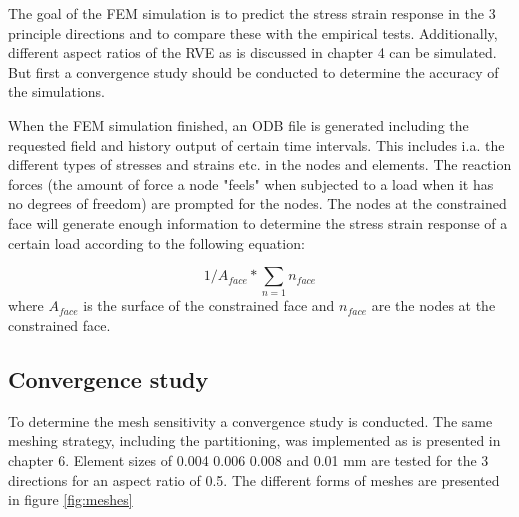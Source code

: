 The goal of the FEM simulation is to predict the stress strain response in the 3 principle directions and to compare these with the empirical tests. Additionally, different aspect ratios of the RVE as is discussed in chapter 4 can be simulated. But first a convergence study should be conducted to determine the accuracy of the simulations.

When the FEM simulation finished, an ODB file is generated including the requested field and history output of certain time intervals. This includes i.a. the different types of stresses and strains etc. in the nodes and elements. The reaction forces (the amount of force a node "feels" when subjected to a load when it has no degrees of freedom) are prompted for the nodes. The nodes at the constrained face will generate enough information to determine the stress strain response of a certain load according to the following equation: 

\begin{equation} \label{eqn:RVESS}
1/A_{face}*\sum_{n=1} n_{face}
\end{equation}where $A_{face}$ is the surface of the constrained face and $n_{face}$ are the nodes at the constrained face. 

\subsection{Convergence study}
To determine the mesh sensitivity a convergence study is conducted. The same meshing strategy, including the partitioning, was implemented as is presented in chapter 6. Element sizes of 0.004 0.006 0.008 and 0.01 mm are tested for the 3 directions for an aspect ratio of 0.5. The different forms of meshes are presented in figure \ref{fig:meshes}

